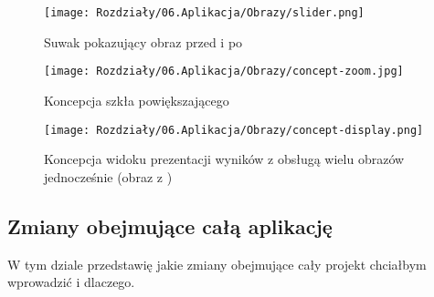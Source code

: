 \begin{figure}[ht]
    \centering
    \begin{minipage}[t]{0.3\linewidth}
        \texttt{[image: Rozdziały/06.Aplikacja/Obrazy/slider.png]}
        \caption{Suwak pokazujący obraz przed i po}
        \label{fig:image95}
    \end{minipage}
    \hspace{0.5cm}
    \begin{minipage}[t]{0.5\linewidth}
        \texttt{[image: Rozdziały/06.Aplikacja/Obrazy/concept-zoom.jpg]}
        \caption{Koncepcja szkła powiększającego}
        \label{fig:image96}
    \end{minipage}
\end{figure}
\begin{figure}[H]
    \centering
    \texttt{[image: Rozdziały/06.Aplikacja/Obrazy/concept-display.png]}
    \caption{Koncepcja widoku prezentacji wyników z obsługą wielu obrazów jednocześnie (obraz z \cite{guo2017deep})}
    \label{fig:image97}
\end{figure}



\subsection*{Zmiany obejmujące całą aplikację}

W tym dziale przedstawię jakie zmiany obejmujące cały projekt chciałbym wprowadzić i dlaczego.

